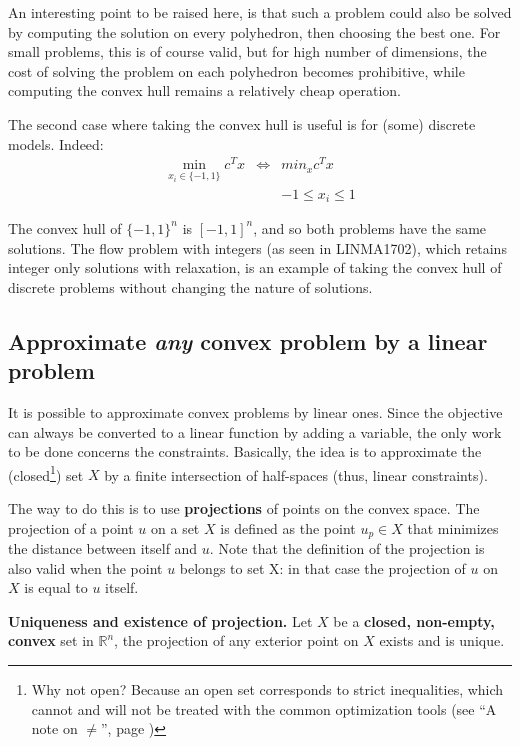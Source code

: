 An interesting point to be raised here, is that such a problem could also be solved by computing the solution on every polyhedron, then choosing the best one. For small problems, this is of course valid, but for high number of dimensions, the cost of solving the problem on each polyhedron becomes prohibitive, while computing the convex hull remains a relatively cheap operation. 

The second case where taking the convex hull is useful is for (some) discrete models. Indeed:
$$\begin{array}{ccl}
\min_{x_i \in \{-1,1\}} c^T x & \Longleftrightarrow & min_{x} c^T x  \\
 & & -1 \leq x_i \leq 1
\end{array}$$

The convex hull of $\{-1,1\}^n$ is $[-1,1]^n$, and so both problems have the same solutions. The flow problem with integers (as seen in LINMA1702), which retains integer only solutions with relaxation, is an example of taking the convex hull of discrete problems without changing the nature of solutions. 

\subsection{Approximate \textit{any} convex problem by a linear problem}

It is possible to approximate convex problems by linear ones. Since the objective can always be converted to a linear function by adding a variable, the only work to be done concerns the constraints. Basically, the idea is to approximate the (closed\footnote{Why not open? Because an open set corresponds to strict inequalities, which cannot and will not be treated with the common optimization tools (see ``A note on $\neq$'', page \pageref{note_on_diff})}) set $X$ by a finite intersection of half-spaces (thus, linear constraints).

The way to do this is to use \textbf{projections} of points on the convex space. The projection of a point $u$ on a set $X$ is defined as the point $u_p \in X$ that minimizes the distance between itself and $u$. Note that the definition of the projection is also valid when the point $u$ belongs to set X: in that case the projection of $u$ on $X$ is equal to $u$ itself.\\

\begin{theorem}{\textbf{Uniqueness and existence of projection.}}
Let $X$ be a \textbf{closed, non-empty, convex} set in $\mathbb{R}^n$, the projection of any exterior point on $X$ exists and is unique.
\end{theorem}

